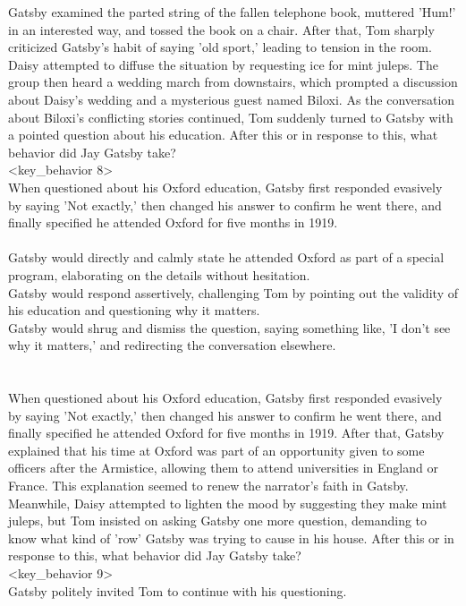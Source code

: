 \begin{tcolorbox}[title = {Behavior Chain}, breakable]
Gatsby examined the parted string of the fallen telephone book, muttered 'Hum!' in an interested way, and tossed the book on a chair. After that, Tom sharply criticized Gatsby's habit of saying 'old sport,' leading to tension in the room. Daisy attempted to diffuse the situation by requesting ice for mint juleps. The group then heard a wedding march from downstairs, which prompted a discussion about Daisy's wedding and a mysterious guest named Biloxi. As the conversation about Biloxi's conflicting stories continued, Tom suddenly turned to Gatsby with a pointed question about his education. After this or in response to this, what behavior did Jay Gatsby take?
\\<key\_behavior 8>\\
When questioned about his Oxford education, Gatsby first responded evasively by saying 'Not exactly,' then changed his answer to confirm he went there, and finally specified he attended Oxford for five months in 1919.
\\<distracters 8>\\
Gatsby would directly and calmly state he attended Oxford as part of a special program, elaborating on the details without hesitation.\\
Gatsby would respond assertively, challenging Tom by pointing out the validity of his education and questioning why it matters.\\
Gatsby would shrug and dismiss the question, saying something like, 'I don't see why it matters,' and redirecting the conversation elsewhere.\\
\\<context 9>\\
When questioned about his Oxford education, Gatsby first responded evasively by saying 'Not exactly,' then changed his answer to confirm he went there, and finally specified he attended Oxford for five months in 1919. After that, Gatsby explained that his time at Oxford was part of an opportunity given to some officers after the Armistice, allowing them to attend universities in England or France. This explanation seemed to renew the narrator's faith in Gatsby. Meanwhile, Daisy attempted to lighten the mood by suggesting they make mint juleps, but Tom insisted on asking Gatsby one more question, demanding to know what kind of 'row' Gatsby was trying to cause in his house. After this or in response to this, what behavior did Jay Gatsby take?
\\<key\_behavior 9>\\
Gatsby politely invited Tom to continue with his questioning.

\end{tcolorbox}
